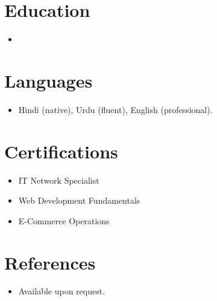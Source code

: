 \documentclass[11pt,a4paper,sans]{moderncv}
\begin{document}
\section{Education}
\vspace{1pt}
\begin{itemize}

\item{}

\end{itemize}


\section{Languages}
\vspace{1pt}
\begin{itemize}
\item {Hindi (native), Urdu (fluent), English (professional).}
\end{itemize}


\section{Certifications}
\vspace{1pt}
\begin{itemize}
\item {IT Network Specialist}
\item {Web Development Fundamentals}
\item {E-Commerce Operations}
\end{itemize}


\section{References}
\vspace{1pt}
\begin{itemize}
\item{Available upon request.}
\end{itemize}
\end{document}
